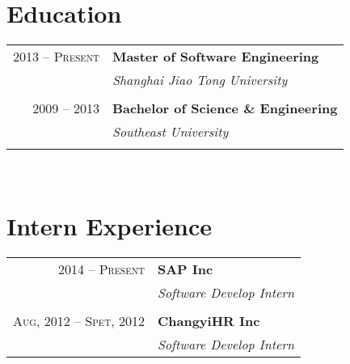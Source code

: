 \documentclass[UTF8,10pt]{article} %
\begin{document}
{\begin{minipage}[t]{0.44\textwidth}
\section{Education} 

\begin{tabular}{rl} %


2013 --  \textsc{Present} & \textbf{Master of Software Engineering} \\ 
& \textit{Shanghai Jiao Tong University}\\
&\\
	 

2009 -- 2013 & \textbf{Bachelor of Science \& Engineering} \\ 
& \textit{Southeast University}\\
&\\
	 


\end{tabular}\\[10pt]



\section{Intern Experience}

\begin{tabular}{rl}
2014 -- \textsc{Present} & \textbf{SAP Inc}\\
& \textit{Software Develop Intern}\\
&\\
\textsc{Aug}, 2012 -- \textsc{Spet, 2012} & \textbf{ChangyiHR Inc}\\
& \textit{Software Develop Intern}\\


\end{tabular}\\[10pt]




\end{minipage}}
\end{document}
